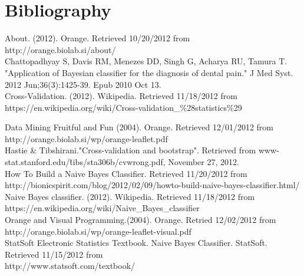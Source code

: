 

\graphicspath{{C:/Documents and Settings/amcelhinney/My Documents/GitHub/MCS507ProjectTwo/tex/include/}}
\newpage

\section{Bibliography} %

\hspace{5 mm}About. (2012). Orange. Retrieved 10/20/2012 from http://orange.biolab.si/about/\\

Chattopadhyay S, Davis RM, Menezes DD, Singh G, Acharya RU, Tamura T. "Application of Bayesian classifier for the diagnosis of dental pain." J Med Syst. 2012 Jun;36(3):1425-39. Epub 2010 Oct 13. \\

Cross-Validation. (2012). Wikipedia. Retrieved 11/18/2012 from \\
https://en.wikipedia.org/wiki/Cross-validation\_\%28statistics\%29

Data Mining Fruitful and Fun (2004). Orange. Retrieved 12/01/2012 from http://orange.biolab.si/wp/orange-leaflet.pdf\\

\hspace{5 mm} Hastie \& Tibshirani."Cross-validation and bootstrap". Retrieved from www-stat.stanford.edu/\~tibs/sta306b/cvwrong.pdf, November 27, 2012.\\

How To Build a Naive Bayes Classifier. Retrieved 11/20/2012 from \\http://bionicspirit.com/blog/2012/02/09/howto-build-naive-bayes-classifier.html/\\

Naive Bayes classifier. (2012). Wikipedia. Retrieved 11/18/2012 from \\
https://en.wikipedia.org/wiki/Naive\_Bayes\_classifier\\

\hspace{5 mm}Orange and Visual Programming.(2004). Orange. Retried 12/02/2012 from http://orange.biolab.si/wp/orange-leaflet-visual.pdf\\

StatSoft Electronic Statistics Textbook. Naive Bayes Classifier. StatSoft. Retrieved 11/15/2012 from 
\\http://www.statsoft.com/textbook/\\

